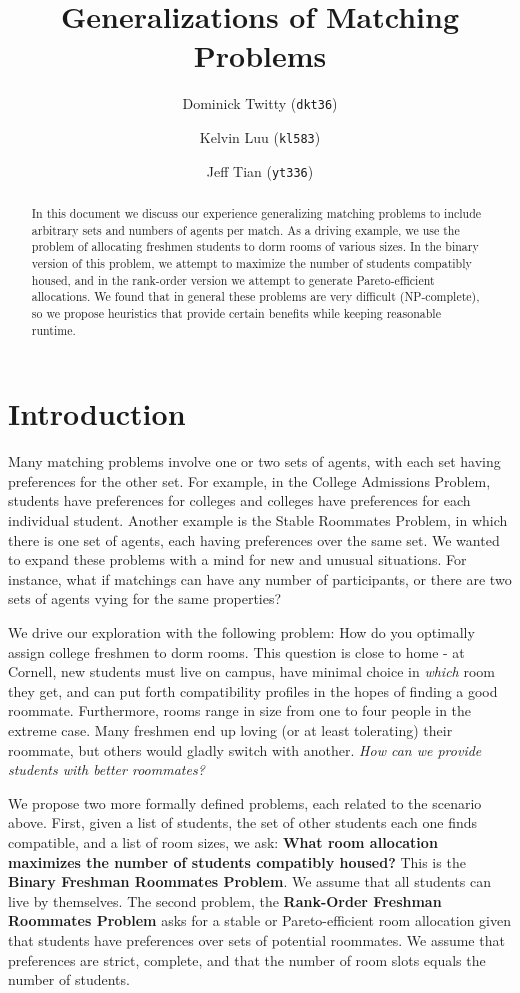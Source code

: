 \documentclass[11pt]{article}
\title{Generalizations of Matching Problems}
\author{Dominick Twitty (\texttt{dkt36})\\
\and Kelvin Luu (\texttt{kl583})\\
\and Jeff Tian (\texttt{yt336})
}
\date{}
\begin{document}
\maketitle

\begin{abstract}
In this document we discuss our experience generalizing matching problems to include arbitrary sets and numbers of agents per match. As a driving example, we use the problem of allocating freshmen students to dorm rooms of various sizes. In the binary version of this problem, we attempt to maximize the number of students compatibly housed, and in the rank-order version we attempt to generate Pareto-efficient allocations. We found that in general these problems are very difficult (NP-complete), so we propose heuristics that provide certain benefits while keeping reasonable runtime.  
\end{abstract}

\section*{Introduction}
Many matching problems involve one or two sets of agents, with each set having preferences for the other set. For example, in the College Admissions Problem, students have preferences for colleges and colleges have preferences for each individual student. Another example is the Stable Roommates Problem, in which there is one set of agents, each having preferences over the same set. We wanted to expand these problems with a mind for new and unusual situations. For instance, what if matchings can have any number of participants, or there are two sets of agents vying for the same properties?

We drive our exploration with the following problem: How do you optimally assign college freshmen to dorm rooms. This question is close to home - at Cornell, new students must live on campus, have minimal choice in \textit{which} room they get, and can put forth compatibility profiles in the hopes of finding a good roommate. Furthermore, rooms range in size from one to four people in the extreme case. Many freshmen end up loving (or at least tolerating) their roommate, but others would gladly switch with another. \textit{How can we provide students with better roommates?}

We propose two more formally defined problems, each related to the scenario above. First, given a list of students, the set of other students each one finds compatible, and a list of room sizes, we ask: \textbf{What room allocation maximizes the number of students compatibly housed?} This is the \textbf{Binary Freshman Roommates Problem}. We assume that all students can live by themselves. The second problem, the \textbf{Rank-Order Freshman Roommates Problem} asks for a stable or Pareto-efficient room allocation given that students have preferences over sets of potential roommates. We assume that preferences are strict, complete, and that the number of room slots equals the number of students.
\end{document}
